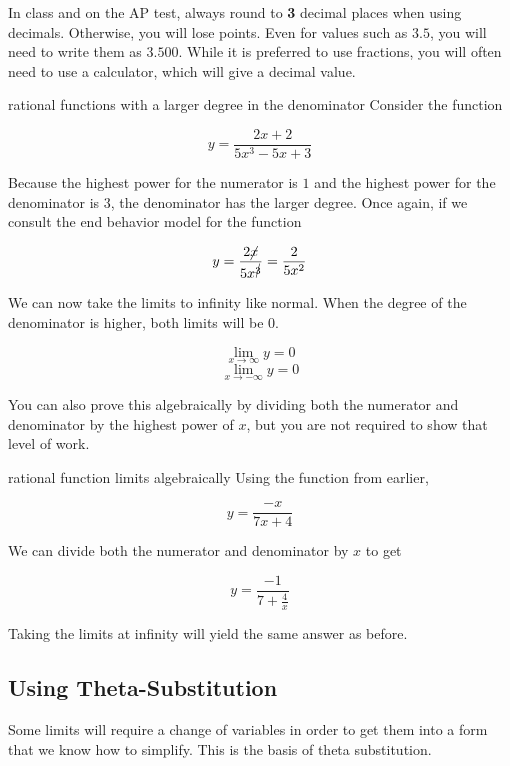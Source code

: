 \begin{tip}
    In class and on the AP test, always round to \textbf{3} decimal places when using decimals. Otherwise, you will lose points. Even for values such as \( 3.5 \), you will need to write them as \( 3.500 \). While it is preferred to use fractions, you will often need to use a calculator, which will give a decimal value.
\end{tip}

\begin{example}{rational functions with a larger degree in the denominator}
    Consider the function
    
    \[ y = \dfrac{2x + 2}{5x^3 - 5x + 3} \]
    
    Because the highest power for the numerator is \( 1 \) and the highest power for the denominator is \( 3 \), the denominator has the larger degree. Once again, if we consult the end behavior model for the function
    
    \[ y = \dfrac{2\cancel{x}}{5x^{\cancel{3}}} = \dfrac{2}{5x^2} \]
    
    We can now take the limits to infinity like normal. When the degree of the denominator is higher, both limits will be \( 0 \).
    
    \[ \lim_{x \to \infty} y = 0 \]
    \[ \lim_{x \to -\infty} y = 0 \]
\end{example}

You can also prove this algebraically by dividing both the numerator and denominator by the highest power of \( x \), but you are not required to show that level of work.

\begin{example}{rational function limits algebraically}
    Using the function from earlier,
    
    \[ y = \dfrac{-x}{7x + 4} \]
    
    We can divide both the numerator and denominator by \( x \) to get
    
    \[ y = \dfrac{-1}{7 + \frac{4}{x}} \]
    
    Taking the limits at infinity will yield the same answer as before.
\end{example}

\subsection{Using Theta-Substitution}

Some limits will require a change of variables in order to get them into a form that we know how to simplify. This is the basis of theta substitution.

